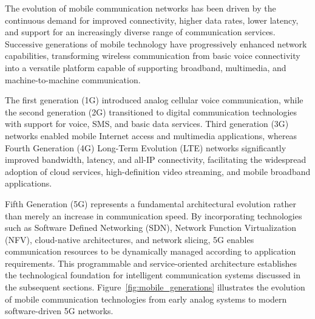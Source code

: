 \documentclass[12pt,a4paper]{report}
\begin{document}
	The evolution of mobile communication networks has been driven by the continuous demand for improved connectivity, higher data rates, lower latency, and support for an increasingly diverse range of communication services. Successive generations of mobile technology have progressively enhanced network capabilities, transforming wireless communication from basic voice connectivity into a versatile platform capable of supporting broadband, multimedia, and machine-to-machine communication.
	
	The first generation (1G) introduced analog cellular voice communication, while the second generation (2G) transitioned to digital communication technologies with support for voice, SMS, and basic data services. Third generation (3G) networks enabled mobile Internet access and multimedia applications, whereas Fourth Generation (4G) Long-Term Evolution (LTE) networks significantly improved bandwidth, latency, and all-IP connectivity, facilitating the widespread adoption of cloud services, high-definition video streaming, and mobile broadband applications.
	
	Fifth Generation (5G) represents a fundamental architectural evolution rather than merely an increase in communication speed. By incorporating technologies such as Software Defined Networking (SDN), Network Function Virtualization (NFV), cloud-native architectures, and network slicing, 5G enables communication resources to be dynamically managed according to application requirements. This programmable and service-oriented architecture establishes the technological foundation for intelligent communication systems discussed in the subsequent sections. Figure~\ref{fig:mobile_generations} illustrates the evolution of mobile communication technologies from early analog systems to modern software-driven 5G networks.
	
\end{document}
